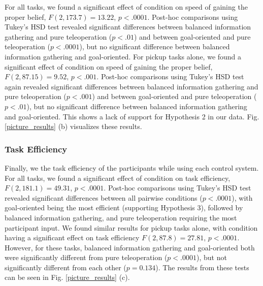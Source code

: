 \documentclass[conference]{IEEEtran}
\begin{document}
For all tasks, we found a significant effect of condition on speed of gaining the proper belief, $F(2, 173.7) = 13.22$, $p < .0001$. Post-hoc comparisons using Tukey's HSD test revealed significant differences between balanced information gathering and pure teleoperation ($p < .01$) and between goal-oriented and pure teleoperation ($p < .0001$), but no significant difference between balanced information gathering and goal-oriented. For pickup tasks alone, we found a significant effect of condition on speed of gaining the proper belief, $F(2, 87.15) = 9.52$, $p < .001$. Post-hoc comparisons using Tukey's HSD test again revealed significant differences between balanced information gathering and pure teleoperation ($p < .001$) and between goal-oriented and pure teleoperation ($p < .01$), but no significant difference between balanced information gathering and goal-oriented. This shows a lack of support for Hypothesis 2 in our data. Fig. \ref{picture_results} (b) visualizes these results.

\subsubsection{Task Efficiency}

Finally, we the task efficiency of the participants while using each control system. For all tasks, we found a significant effect of condition on task efficiency, $F(2, 181.1) = 49.31$, $p < .0001$. Post-hoc comparisons using Tukey's HSD test revealed significant differences between all pairwise conditions ($p < .0001$), with goal-oriented being the most efficient (supporting Hypothesis 3), followed by balanced information gathering, and pure teleoperation requiring the most participant input. We found similar results for pickup tasks alone, with condition having a significant effect on task efficiency $F(2, 87.8) = 27.81$, $p < .0001$. However, for these tasks, balanced information gathering and goal-oriented both were significantly different from pure teleoperation ($p < .0001$), but not significantly different from each other ($p = 0.134$). The results from these tests can be seen in Fig. \ref{picture_results} (c).
\end{document}
